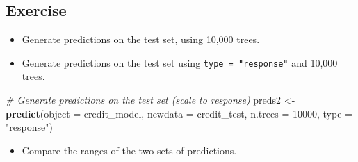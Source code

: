 \documentclass[
]{book}
\newenvironment{Shaded}{\begin{snugshade}}{\end{snugshade}}
\newcommand{\CommentTok}[1]{\textcolor[rgb]{0.56,0.35,0.01}{\textit{#1}}}
\newcommand{\DataTypeTok}[1]{\textcolor[rgb]{0.13,0.29,0.53}{#1}}
\newcommand{\DecValTok}[1]{\textcolor[rgb]{0.00,0.00,0.81}{#1}}
\newcommand{\KeywordTok}[1]{\textcolor[rgb]{0.13,0.29,0.53}{\textbf{#1}}}
\newcommand{\NormalTok}[1]{#1}
\newcommand{\OperatorTok}[1]{\textcolor[rgb]{0.81,0.36,0.00}{\textbf{#1}}}
\newcommand{\StringTok}[1]{\textcolor[rgb]{0.31,0.60,0.02}{#1}}
\providecommand{\tightlist}{%
  \setlength{\itemsep}{0pt}\setlength{\parskip}{0pt}}
\begin{document}
\hypertarget{exercise-23}{%
\subsection*{Exercise}\label{exercise-23}}

\begin{itemize}
\tightlist
\item
  Generate predictions on the test set, using 10,000 trees.
\end{itemize}

\begin{Shaded}
\end{Shaded}

\begin{itemize}
\tightlist
\item
  Generate predictions on the test set using \texttt{type\ =\ "response"} and 10,000 trees.
\end{itemize}

\begin{Shaded}
\begin{Highlighting}[]
\CommentTok{# Generate predictions on the test set (scale to response)}
\NormalTok{preds2 <-}\StringTok{ }\KeywordTok{predict}\NormalTok{(}\DataTypeTok{object =}\NormalTok{ credit_model, }
                  \DataTypeTok{newdata =}\NormalTok{ credit_test,}
                  \DataTypeTok{n.trees =} \DecValTok{10000}\NormalTok{,}
                  \DataTypeTok{type =} \StringTok{"response"}\NormalTok{)}
\end{Highlighting}
\end{Shaded}

\begin{itemize}
\tightlist
\item
  Compare the ranges of the two sets of predictions.
\end{itemize}
\end{document}
